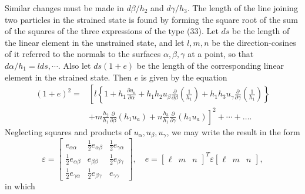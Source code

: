 Similar changes must be made in \(d \beta / h_2\) and
\(d \gamma / h_3\). The length of the line joining two particles in the
strained state is found by forming the square root of the sum of the
squares of the three expressions of the type (33). Let \(d s\) be the
length of the linear element in the unstrained state, and let
\(l, m, n\) be the direction-cosines of it referred to the normals to
the surfaces \(\alpha, \beta, \gamma \) at a point, so that
\(d \alpha / h_1=l d s, \cdots \). Also let \(d s(1+e)\) be the length of
the corresponding linear element in the strained state. Then \(e\) is
given by the equation
\[
\begin{aligned}
{(1+e)}^2= & {\left[l\left\{1+h_1 \frac{\partial u_a}{\partial \alpha}+h_1 h_2
u_\beta \frac{\partial}{\partial \beta}\left(\frac{1}{h_1}\right)+h_1 h_3
u_\gamma \frac{\partial}{\partial
\gamma}\left(\frac{1}{h_1}\right)\right\}\right.} \\
& \left.+m \frac{h_2}{h_1} \frac{\partial}{\partial \beta}\left(h_1
u_a\right)+n \frac{h_3}{h_1} \frac{\partial}{\partial \gamma}\left(h_1
u_a\right)\right]^2+\cdots+\ldots .
\end{aligned}
\]
Neglecting squares and products of \(u_\alpha, u_\beta, u_\gamma \), we
may write the result in the form
\[
\varepsilon =
\begin{bmatrix}
e_{\alpha \alpha} & \frac{1}{2} e_{\alpha \beta} & \frac{1}{2} e_{\gamma \alpha}  \\
\frac{1}{2} e_{\alpha \beta}  & e_{\beta \beta} & \frac{1}{2} e_{\beta \gamma}  \\
\frac{1}{2} e_{\gamma \alpha}  & \frac{1}{2} e_{\beta \gamma} & e_{\gamma \gamma}
\end{bmatrix}, \quad
e=\begin{bmatrix} \ell & m & n \end{bmatrix}^T
\varepsilon \begin{bmatrix} \ell & m & n \end{bmatrix},
\]
in which
